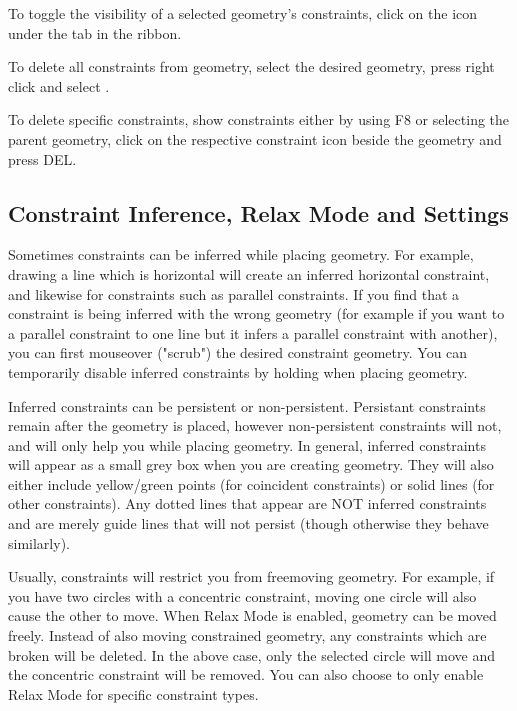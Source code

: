 To toggle the visibility of a selected geometry's constraints, click on the  icon under the  tab in the ribbon.

To delete all constraints from geometry, select the desired geometry, press right click and select .

To delete specific constraints, show constraints either by using F8 or selecting the parent geometry, click on the respective constraint icon beside the geometry and press DEL.
\cbend
\subsection{Constraint Inference, Relax Mode and Settings}

\cbstart
{}

Sometimes constraints can be inferred while placing geometry. For example, drawing a line which is horizontal will create an inferred horizontal constraint, and likewise for constraints such as parallel constraints. If you find that a constraint is being inferred with the wrong geometry (for example if you want to a parallel constraint to one line but it infers a parallel constraint with another), you can first mouseover ("scrub") the desired constraint geometry. You can temporarily disable inferred constraints by holding  when placing geometry.

Inferred constraints can be persistent or non-persistent. Persistant constraints remain after the geometry is placed, however non-persistent constraints will not, and will only help you while placing geometry. In general, inferred constraints will appear as a small grey box when you are creating geometry. They will also either include yellow/green points (for coincident constraints) or solid lines (for other constraints). Any dotted lines that appear are NOT inferred constraints and are merely guide lines that will not persist (though otherwise they behave similarly).

Usually, constraints will restrict you from freemoving geometry. For example, if you have two circles with a concentric constraint, moving one circle will also cause the other to move. When Relax Mode is enabled, geometry can be moved freely. Instead of also moving constrained geometry, any constraints which are broken will be deleted. In the above case, only the selected circle will move and the concentric constraint will be removed. You can also choose to only enable Relax Mode for specific constraint types.

